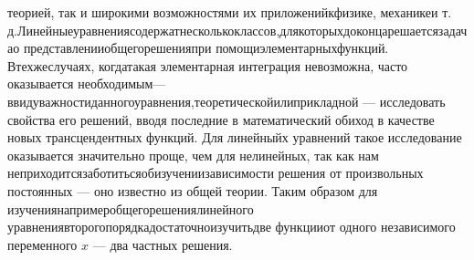 \documentclass[10pt, a5paper, twoside]{book}
\begin{document}
теорией, так и широкими возможностями их приложений\hspace{2mm}к\hspace{2mm}физике, механике\hspace{2mm}и т. д.\hspace{2mm}Линейные\hspace{2mm}уравнения\hspace{2mm}содержат\hspace{2mm}несколько\hspace{2mm}классов,\hspace{2mm}для\hspace{2mm}которых\hspace{2mm}до\hspace{2mm}конца\hspace{2mm}решается\hspace{2mm}задача\hspace{2mm}о представлении\hspace{2mm}общего\hspace{2mm}решения\hspace{2mm}при помощи\hspace{2mm}элементарных\hspace{2mm}функций. В\hspace{2mm}тех\hspace{2mm}же\hspace{2mm}случаях, когда\hspace{2mm}такая элементарная интеграция невозможна, часто оказывается необходимым--- ввиду\hspace{2mm}важности\hspace{2mm}данного\hspace{2mm}уравнения,\hspace{2mm}теоретической\hspace{2mm}или\hspace{2mm}прикладной --- исследовать свойства его решений, вводя последние в математический обиход в качестве новых трансцендентных функций. Для линейныйх уравнений такое исследование оказывается значительно проще, чем для нелинейных, так как нам не\hspace{2mm}приходится\hspace{2mm}заботиться\hspace{2mm}об\hspace{2mm}изучении\hspace{2mm}зависимости решения от произвольных постоянных --- оно известно из общей теории. Таким образом для изучения\hspace{2mm}например\hspace{2mm}общего\hspace{2mm}решения\hspace{2mm}линейного уравнения\hspace{2mm}второго\hspace{2mm}порядка\hspace{2mm}достаточно\hspace{2mm}изучить\hspace{2mm}две функции\hspace{2mm}от одного независимого переменного $x$ --- два частных решения.
\end{document}
